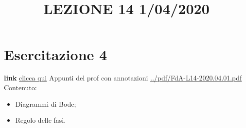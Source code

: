 \section{Esercitazione 4}
\title{LEZIONE 14 1/04/2020}\newline
\textbf{link} \href{https://web.microsoftstream.com/video/7cfe3714-fd1e-453f-8394-f7abd4d747ad?list=user&userId=faa91214-a6f5-40d7-8875-253fd49b8ce1}{clicca qui}\newline
\newline
Appunti del prof con annotazioni \url{../pdf/FdA-L14-2020.04.01.pdf}\newline
Contenuto:
\begin{itemize}
    \item Diagrammi di Bode;
    \item Regolo delle fasi.
\end{itemize}